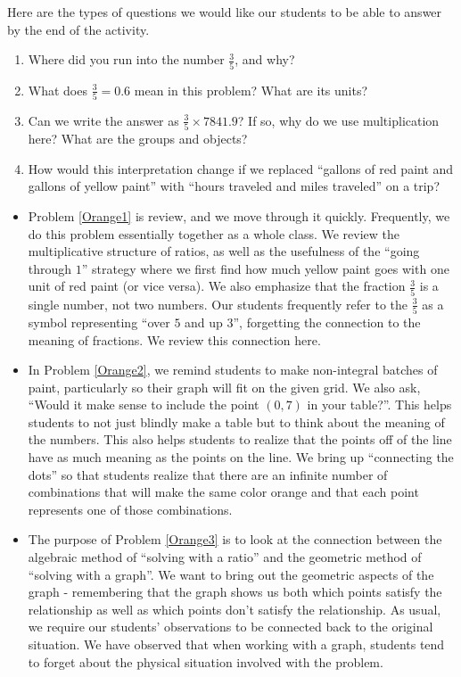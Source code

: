 \documentclass[nooutcomes]{ximera}
\begin{document}
\begin{instructorNotes}
Here are the types of questions we would like our students to be able to answer by the end of the activity.
\begin{enumerate}
    \item Where did you run into the number $\frac35$, and why?      
    \item What does $\frac35 = 0.6$ mean in this problem?  What are its units?     
    \item Can we write the answer as $\frac35 \times 7841.9$? If so, why do we use multiplication here?  What are the groups and objects?  
    \item How would this interpretation change if we replaced ``gallons of red paint and gallons of yellow paint'' with ``hours traveled and miles traveled'' on a trip?
\end{enumerate}
\begin{itemize}
    \item Problem \ref{Orange1} is review, and we move through it quickly.  Frequently, we do this problem essentially together as a whole class.  We review the multiplicative structure of ratios, as well as the usefulness of the ``going through $1$'' strategy where we first find how much yellow paint goes with one unit of red paint (or vice versa).  We also emphasize that the fraction $\frac{3}{5}$ is a single number, not two numbers.  Our students frequently refer to the $\frac{3}{5}$ as a symbol representing ``over $5$ and up $3$'', forgetting the connection to the meaning of fractions.  We review this connection here.
    \item In Problem \ref{Orange2}, we remind students to make non-integral batches of paint, particularly so their graph will fit on the given grid.  We also ask, ``Would it make sense to include the point $(0,7)$ in your table?''.  This helps students to not just blindly make a table but to think about the meaning of the numbers.  This also helps students to realize that the points off of the line have as much meaning as the points on the line.  We bring up ``connecting the dots'' so that students realize that there are an infinite number of combinations that will make the same color orange and that each point represents one of those combinations.
    \item The purpose of Problem \ref{Orange3} is to look at the connection between the algebraic method of ``solving with a ratio'' and the geometric method of ``solving with a graph''.  We want to bring out the geometric aspects of the graph - remembering that the graph shows us both which points satisfy the relationship as well as which points don't satisfy the relationship.  As usual, we require our students' observations to be connected back to the original situation.  We have observed that when working with a graph, students tend to forget about the physical situation involved with the problem.

\end{itemize}
\end{instructorNotes}
\end{document}
